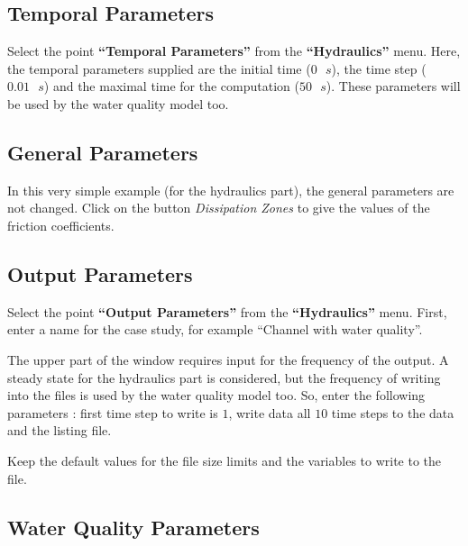 \documentclass[a4paper,12pt]{article}
\begin{document}
\subsection{Temporal Parameters}

\hspace{0.5cm}Select the point \textbf{{}``Temporal Parameters''} from the \textbf{{}``Hydraulics''}
menu. Here, the temporal parameters supplied are the initial time
($0\mbox{ }s$), the time step ($0.01\mbox{ }s$) and the maximal time for the computation
($50\mbox{ }s$). These parameters will be used by the water quality model too.


\subsection{General Parameters}

\hspace{0.5cm}In this very simple example (for the hydraulics part), the general
parameters are not changed. Click on the button \textit{Dissipation Zones} to give the values of the friction coefficients.


\subsection{Output Parameters}

\hspace{0.5cm}Select the point \textbf{{}``Output Parameters''} from the \textbf{{}``Hydraulics''}
menu. First, enter a name for the case study, for example {}``Channel
with water quality''. 

\vspace{0.5cm}

The upper part of the window requires input for the frequency of the
output. A steady state for the hydraulics part is considered, but
the frequency of writing into the files is used by the water quality
model too. So, enter the following parameters : first time step to
write is $1$, write data all $10$ time steps to the data and the listing
file.

\vspace{0.5cm}

Keep the default values for the file size limits and the variables
to write to the file.


\subsection{Water Quality Parameters}
\end{document}
